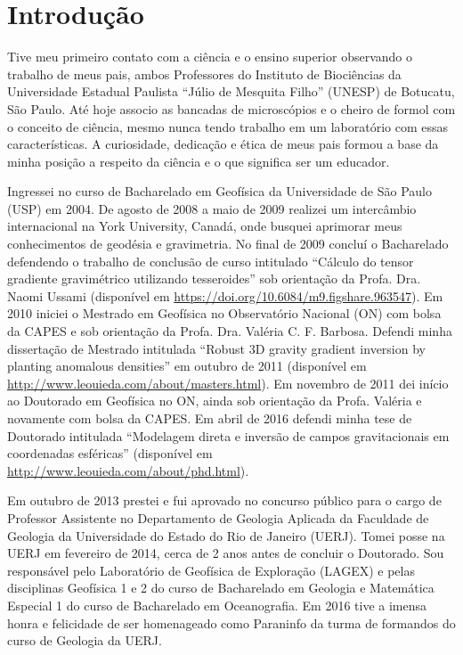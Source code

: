 \section{Introdução}


Tive meu primeiro contato com a ciência e o ensino superior observando o
trabalho de meus pais, ambos Professores do Instituto de Biociências da
Universidade Estadual Paulista ``Júlio de Mesquita Filho'' (UNESP) de Botucatu,
São Paulo.
Até hoje associo as bancadas de microscópios e o cheiro de formol com o
conceito de ciência, mesmo nunca tendo trabalho em um laboratório com essas
características.
A curiosidade, dedicação e ética de meus pais formou a base da minha posição a
respeito da ciência e o que significa ser um educador.

Ingressei no curso de Bacharelado em Geofísica da Universidade de São
Paulo (USP) em 2004.
De agosto de 2008 a maio de 2009 realizei um intercâmbio internacional na York
University, Canadá, onde busquei aprimorar meus conhecimentos de geodésia e
gravimetria.
No final de 2009 concluí o Bacharelado defendendo o trabalho de conclusão de
curso intitulado ``Cálculo do tensor gradiente gravimétrico utilizando
tesseroides'' sob orientação da Profa. Dra. Naomi Ussami
(disponível em \url{https://doi.org/10.6084/m9.figshare.963547}).
Em 2010 iniciei o Mestrado em Geofísica no Observatório Nacional (ON) com bolsa
da CAPES e sob orientação da Profa. Dra. Valéria C. F. Barbosa.
Defendi minha dissertação de Mestrado intitulada ``Robust 3D gravity gradient
inversion by planting anomalous densities'' em outubro de 2011 (disponível em
\url{http://www.leouieda.com/about/masters.html}).
Em novembro de 2011 dei início ao Doutorado em Geofísica no ON, ainda sob
orientação da Profa. Valéria e novamente com bolsa da CAPES.
Em abril de 2016 defendi minha tese de Doutorado intitulada ``Modelagem direta
e inversão de campos gravitacionais em coordenadas esféricas''
(disponível em \url{http://www.leouieda.com/about/phd.html}).

Em outubro de 2013 prestei e fui aprovado no concurso público para o cargo de
Professor Assistente no Departamento de Geologia Aplicada da Faculdade de
Geologia da Universidade do Estado do Rio de Janeiro (UERJ).
Tomei posse na UERJ em fevereiro de 2014, cerca de 2 anos antes de concluir o
Doutorado.
Sou responsável pelo Laboratório de Geofísica de Exploração (LAGEX) e pelas
disciplinas Geofísica 1 e 2 do curso de Bacharelado em Geologia e Matemática
Especial 1 do curso de Bacharelado em Oceanografia.
Em 2016 tive a imensa honra e felicidade de ser homenageado como Paraninfo da
turma de formandos do curso de Geologia da UERJ.

